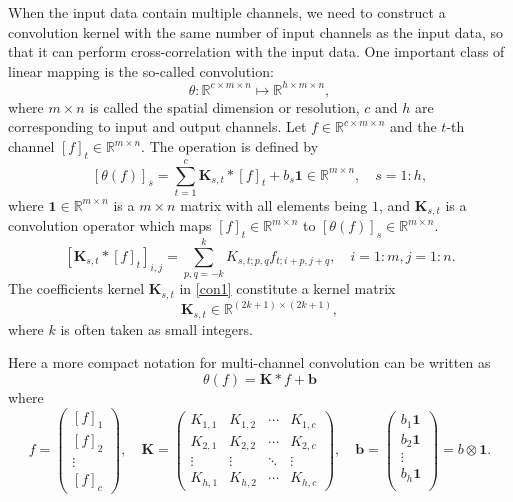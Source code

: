 When the input data contain multiple channels, we need to construct a convolution kernel with the same number of input channels as the input data, so that it can perform cross-correlation with the input data. 
One important class of linear mapping is the so-called convolution:
$$
\theta: \mathbb{R}^{c\times m\times n} \mapsto \mathbb{R}^{h\times m\times n},
$$
where $m\times n$ is called the spatial dimension or resolution, $c$ and $h$ are corresponding
to input and output channels. Let $f\in \mathbb{R}^{c\times m\times n}$ and the $t$-th channel $[f]_t \in \mathbb{R}^{m\times n}$.
The operation is defined by 
\begin{equation}\label{conv-1}
[\theta(f)]_{s} = \sum_{t=1}^{c}\mathbf{K}_{s,t} \ast [f]_t + b_s
\bm{1}  \in \mathbb{R}^{m\times n}, \quad s = 1:h,
\end{equation}
where $\bm{1}  \in \mathbb{R}^{m\times n} $ is a 
$m\times n$ matrix with all elements being $1$,
and $\mathbf{K}_{s,t}$ is a convolution operator which maps $ [f]_t\in \mathbb{R}^{m\times n}$ to $[\theta(f)]_{s} \in \mathbb{R}^{m\times n}$.
\begin{equation}\label{con1}
[\mathbf{K}_{s,t} \ast [f]_t]_{i,j} = \sum_{p,q=-k}^k K_{s,t; p,q} f_{t; i + p, j + q}, \quad i=1:m, j = 1:n.
\end{equation}
The coefficients kernel $\mathbf{K}_{s,t}$ in \eqref{con1} constitute  a kernel matrix
\begin{equation}
\mathbf{K}_{s,t} \in \mathbb{R}^{(2k+1) \times (2k+1)},
\end{equation}
where $k$ is often taken as small integers. 

Here a more compact notation for multi-channel convolution can be written as
\begin{equation}
\theta(f) = \mathbf{K} \ast f + \mathbf b
\end{equation}
where
\begin{equation}\label{key}
f = \begin{pmatrix}
[f]_1 \\
[f]_2 \\
\vdots \\
[f]_c
\end{pmatrix},
\quad 
\mathbf{K} = \begin{pmatrix}
K_{1,1} & K_{1,2} & \cdots & K_{1,c} \\
K_{2,1} & K_{2,2} & \cdots & K_{2,c} \\
\vdots & \vdots & \ddots& \vdots \\
K_{h,1} & K_{h,2} & \cdots & K_{h,c} 
\end{pmatrix}, 
\quad 
\mathbf b = \begin{pmatrix}
b_1 \bm 1\\
b_2 \bm 1\\
\vdots \\
b_h \bm 1\\
\end{pmatrix}=b\otimes \bm 1.
\end{equation}

